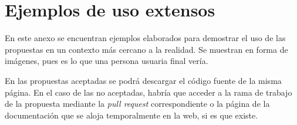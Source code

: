 \chapter{Ejemplos de uso extensos} \label{chp:anexo_docs_examples}

En este anexo se encuentran ejemplos elaborados para demostrar el uso de las propuestas en un contexto más cercano a la realidad. Se muestran en forma de imágenes, pues es lo que una persona usuaria final vería.

En las propuestas aceptadas se podrá descargar el código fuente de la misma página. En el caso de las no aceptadas, habría que acceder a la \gls{rama} de trabajo de la propuesta mediante la \textit{\gls{pull request}} correspondiente o la página de la documentación que se aloja temporalmente en la web, si es que existe.

